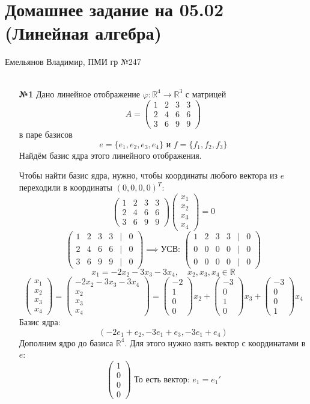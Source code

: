 \documentclass[a4paper]{article}
\newcommand{\mat}[1]{\begin{pmatrix} #1 \end{pmatrix}}
\newcommand{\RR}{\mathbb{R}}
\begin{document}
\section*{Домашнее задание на 05.02 (Линейная алгебра)}
 {\large Емельянов Владимир, ПМИ гр №247}\\\\
\begin{enumerate}
    \item[\textbf{№1}]Дано линейное отображение $\varphi: \mathbb{R}^{4} \rightarrow \mathbb{R}^{3}$ 
    с матрицей 
    $$A=\begin{pmatrix} 1 & 2 & 3 & 3 \\ 2 & 4 & 6 & 6 \\ 3 & 6 & 9 & 9 \end{pmatrix}$$ 
    в паре базисов 
    $$e=\{e_{1}, e_{2}, e_{3}, e_{4}\} \text{ и } f = \{f_{1}, f_{2}, f_{3}\}$$
    Найдём базис ядра этого линейного отображения.

    Чтобы найти базис ядра, нужно, чтобы координаты любого вектора из $e$ переходили в координаты $(0, 0, 0, 0)^{T}$:
    $$\begin{pmatrix} 1 & 2 & 3 & 3 \\ 2 & 4 & 6 & 6 \\ 3 & 6 & 9 & 9 \end{pmatrix}\mat{x_1 \\ x_2 \\ x_3 \\ x_4} = 0$$
    $$\begin{pmatrix} 1 & 2 & 3 & 3 & | & 0 \\ 2 & 4 & 6 & 6 & | & 0\\ 3 & 6 & 9 & 9 & | & 0\end{pmatrix} \implies \text{УСВ: }
    \begin{pmatrix}
        1 & 2 & 3 & 3 & | & 0 \\
        0 & 0 & 0 & 0 & | & 0 \\
        0 & 0 & 0 & 0 & | & 0
    \end{pmatrix}$$
    $$x_1 = -2x_2-3x_3-3x_4, \quad x_2, x_3, x_4 \in \RR$$
    $$\mat{x_1 \\ x_2 \\ x_3 \\x_4} = \mat{-2x_2-3x_3-3x_4 \\ x_2 \\ x_3 \\x_4} = \mat{-2\\1\\0\\0}x_2+\mat{-3\\0\\1\\0}x_3+\mat{-3\\0\\0\\1}x_4$$
    Базис ядра:
    $$(-2e_1+e_2, -3e_1+e_3, -3e_1+e_4)$$
    Дополним ядро до базиса $\RR^4$. Для этого нужно взять вектор с координатами в $e$:
    $$\mat{1\\0\\0\\0}
    \text{ То есть вектор: }
    e_1 = e_1'$$


\end{enumerate}
\end{document}
